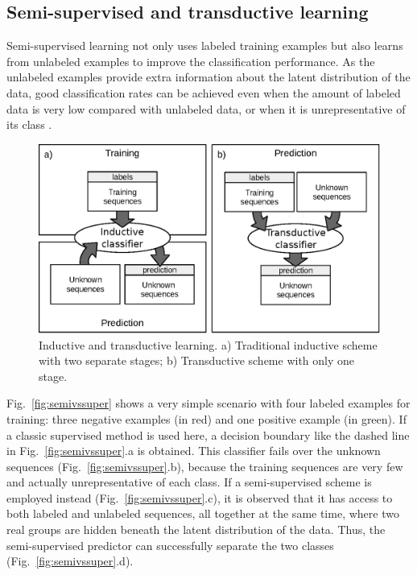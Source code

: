 \documentclass{article}
\begin{document}
\subsection{Semi-supervised and transductive learning} \label{sec:semisupervised}
Semi-supervised learning not only uses labeled training examples but also learns from unlabeled examples to improve the classification performance. As the unlabeled examples provide extra information about the latent distribution of the data, good classification rates can be achieved even when the amount of labeled data is very low compared with unlabeled data, or when it is unrepresentative of its class \citep{chapelle2006semi}.
\begin{figure}[tpb]
	\centering
	\includegraphics[width=0.6\linewidth]{paradigmas.eps}
	\caption{Inductive and transductive learning. a) Traditional inductive scheme with two separate stages; b) Transductive scheme with only one stage.}
	\label{fig:schemes}
\end{figure}
Fig.~\ref{fig:semivssuper} shows a very simple scenario with four labeled examples for training: three negative examples (in red) and one positive example (in green). If a classic supervised method is used here, a decision boundary like the dashed line in Fig.~\ref{fig:semivssuper}.a is obtained. This classifier fails over the unknown sequences (Fig.~\ref{fig:semivssuper}.b), because the training sequences are very few and actually unrepresentative of each class. If a semi-supervised scheme is employed instead (Fig.~\ref{fig:semivssuper}.c), it is observed that it has access to both labeled and unlabeled sequences, all together at the same time, where two real groups are hidden beneath the latent distribution of the data. Thus, the semi-supervised predictor can successfully separate the two classes (Fig.~\ref{fig:semivssuper}.d).
\end{document}
